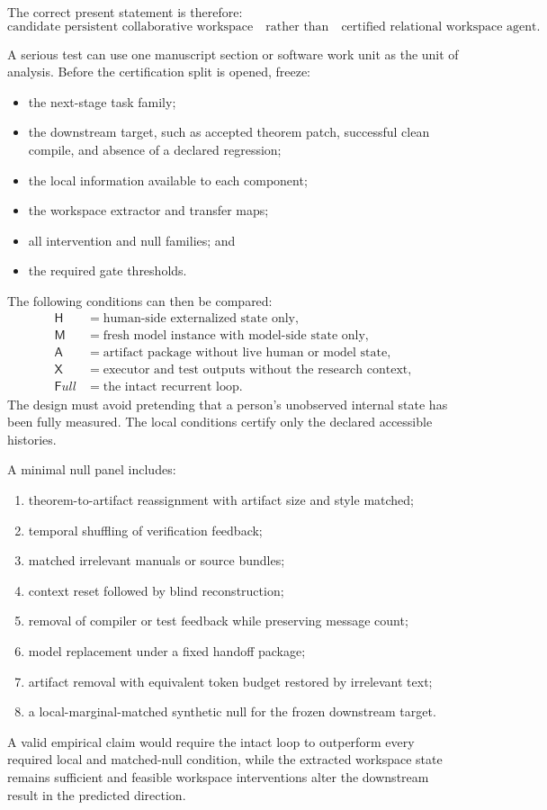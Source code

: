 The correct present statement is therefore:
\[
\boxed{
\text{candidate persistent collaborative workspace}
\quad\text{rather than}\quad
\text{certified relational workspace agent}.
}
\]


A serious test can use one manuscript section or software work unit as the unit of analysis.
Before the certification split is opened, freeze:
\begin{itemize}
\item the next-stage task family;
\item the downstream target, such as accepted theorem patch, successful clean
 compile, and absence of a declared regression;
\item the local information available to each component;
\item the workspace extractor and transfer maps;
\item all intervention and null families; and
\item the required gate thresholds.
\end{itemize}
The following conditions can then be compared:
\[
\begin{array}{ll}
\mathsf H & =\text{human-side externalized state only},\\
\mathsf M & =\text{fresh model instance with model-side state only},\\
\mathsf A & =\text{artifact package without live human or model state},\\
\mathsf X & =\text{executor and test outputs without the research context},\\
\mathsf Full & =\text{the intact recurrent loop}.
\end{array}
\]
The design must avoid pretending that a person's unobserved internal state has
been fully measured. The local conditions certify only the declared accessible
histories.

A minimal null panel includes:
\begin{enumerate}
\item theorem-to-artifact reassignment with artifact size and style matched;
\item temporal shuffling of verification feedback;
\item matched irrelevant manuals or source bundles;
\item context reset followed by blind reconstruction;
\item removal of compiler or test feedback while preserving message count;
\item model replacement under a fixed handoff package;
\item artifact removal with equivalent token budget restored by irrelevant text;
\item a local-marginal-matched synthetic null for the frozen downstream target.
\end{enumerate}
A valid empirical claim would require the intact loop to outperform every
required local and matched-null condition, while the extracted workspace state
remains sufficient and feasible workspace interventions alter the downstream
result in the predicted direction.

